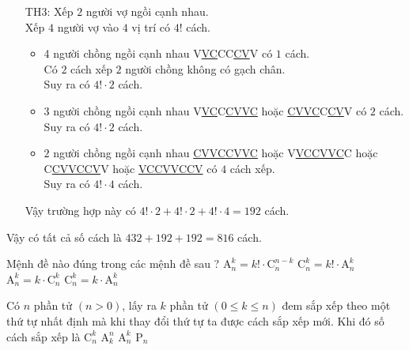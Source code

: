 \begin{ex}
{\begin{itemize}
\begin{itemize}
				Suy ra có $4!\cdot 2$ cách.
				\item $2$ người chồng ngồi cạnh nhau: \underline{VC}\underline{CV}V\underline{VC}C hoặc C\underline{CV}V\underline{VC}\underline{CV} có $2$ cách xếp.
				\\
				Suy ra $4!\cdot 2$ cách.
			\end{itemize}
			Vậy trường hợp này có $4!\cdot 2\cdot 2+4!\cdot 2+4!\cdot 2=192 $ cách.
			\item [TH3:] Xếp $2$ người vợ ngồi cạnh nhau.
			\\
			Xếp $4$ người vợ vào $4$ vị trí có $4!$ cách.
			\begin{itemize}
				\item 4 người chồng ngồi cạnh nhau V\underline{VC}CC\underline{CV}V có $1$ cách.
				\\
				Có $2$ cách xếp $2$ người chồng không có gạch chân.
				\\
				Suy ra có $4!\cdot 2$ cách.
				\item 3 người chồng ngồi cạnh nhau V\underline{VC}C\underline{CV}\underline{VC} hoặc \underline{CV}\underline{VC}C\underline{CV}V có $2$ cách.
				\\
				Suy ra có $4!\cdot 2$ cách.
				\item $2$ người chồng ngồi cạnh nhau \underline{CV}\underline{VC}\underline{CV}\underline{VC} hoặc V\underline{VC}\underline{CV}\underline{VC}C hoặc C\underline{CVVCCV}V hoặc \underline{VCCVVCCV} có $4$ cách xếp.
				\\
				Suy ra có $4!\cdot 4$ cách.
			\end{itemize}
			Vậy trường hợp này có $4!\cdot 2+4!\cdot 2+4!\cdot 4=192 $ cách.
		\end{itemize}
		Vậy có tất cả số cách là $432+192+192=816$ cách.
	}
\end{ex}
\begin{ex}%
	Mệnh đề nào đúng trong các mệnh đề sau ?
	\choice
	{\True $\mathrm A_n^k = k! \cdot \mathrm C_n^{n-k}  $}
	{$\mathrm C_n^k = k! \cdot \mathrm A_n^k  $}
	{$\mathrm A_n^k = k \cdot \mathrm C_n^k  $}
	{$\mathrm C_n^k = k \cdot \mathrm A_n^k  $}
\end{ex}

\begin{ex}%
	Có $n$ phần tử $(n>0)$, lấy ra $k$ phần tử $(0 \le k \le n)$ đem sắp xếp theo một thứ tự nhất định mà khi thay đổi thứ tự ta được cách sắp xếp mới. Khi đó số cách sắp xếp là
	\choice
	{$\mathrm C_n^k $}
	{$\mathrm A_k^n $}
	{\True $ \mathrm A_n^k $}
	{$ \mathrm P_n$}
\end{ex}

